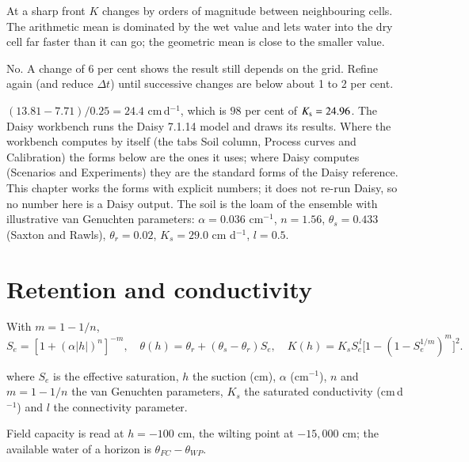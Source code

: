 \sol  At a sharp front $K$ changes by orders of magnitude between neighbouring cells. The arithmetic mean is dominated by the wet value and lets water into the dry cell far faster than it can go; the geometric mean is close to the smaller value. \finans

\sol  No. A change of 6 per cent shows the result still depends on the grid. Refine again (and reduce $\Delta t$) until successive changes are below about 1 to 2 per cent. \finans

\sol  $(13.81-7.71)/0.25=24.4$ cm\,d$^{-1}$, which is $98$ per cent of $K_{\mathrm s}=24.96$.
\label{ch:daisy}
The Daisy workbench runs the Daisy 7.1.14 model and draws its results. Where the workbench computes by itself (the tabs Soil column, Process curves and Calibration) the forms below are the ones it uses; where Daisy computes (Scenarios and Experiments) they are the standard forms of the Daisy reference. This chapter works the forms with explicit numbers; it does not re-run Daisy, so no number here is a Daisy output. The soil is the loam of the ensemble with illustrative van Genuchten parameters: $\alpha=0.036$ cm$^{-1}$, $n=1.56$, $\theta_s=0.433$ (Saxton and Rawls), $\theta_r=0.02$, $K_s=29.0$ cm d$^{-1}$, $l=0.5$. \finans

\section{Retention and conductivity}
With $m=1-1/n$,
\begin{equation}\boxed{S_e=[1+(\alpha|h|)^n]^{-m},\quad\theta(h)=\theta_r+(\theta_s-\theta_r)S_e,\quad K(h)=K_sS_e^{\,l}\big[1-(1-S_e^{1/m})^m\big]^2.}\end{equation}
\par\noindent where $S_e$ is the effective saturation, $h$ the suction (cm), $\alpha$ (cm$^{-1}$), $n$ and $m=1-1/n$ the van Genuchten parameters, $K_s$ the saturated conductivity (cm\,d$^{-1}$) and $l$ the connectivity parameter.

Field capacity is read at $h=-100$ cm, the wilting point at $-15{,}000$ cm; the available water of a horizon is $\theta_{FC}-\theta_{WP}$.

